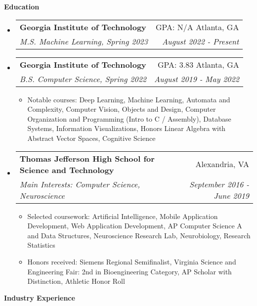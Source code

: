 \documentclass[letterpaper,11pt]{article}
\makeatletter
\newcommand{\resitem}[1]{\item #1 \vspace{-2pt}}
\newcommand{\resheading}[1]{{\large \colorbox{mygrey}{\begin{minipage}{\textwidth}{\textbf{#1 \vphantom{p\^{E}}}}\end{minipage}}}}
\newcommand{\ressubheading}[4]{
\begin{tabular*}{7.0in}{l@{\extracolsep{\fill}}r}
		\textbf{#1} & #2 \\
		\textit{#3} & \textit{#4} \\
\end{tabular*}\vspace{-6pt}}
\makeatother
\begin{document}
\resheading{Education}
\begin{itemize}
\item[]
    \ressubheading{Georgia Institute of Technology}{GPA: N/A \hspace{1em} Atlanta, GA}{M.S. Machine Learning, Spring 2023}{August 2022 - Present}
\item[]  %
    \ressubheading{Georgia Institute of Technology}{GPA: 3.83 \hspace{1em} Atlanta, GA}{B.S. Computer Science, Spring 2022}{August 2019 - May 2022}
	\begin{itemize}
	    \resitem{Notable courses: Deep Learning, Machine Learning, Automata and Complexity, Computer Vision, Objects and Design, Computer Organization and Programming (Intro to C / Assembly), Database Systems, Information Visualizations, Honors Linear Algebra with Abstract Vector Spaces, Cognitive Science}
	\end{itemize}
\item[]
    \ressubheading{Thomas Jefferson High School for Science and Technology}{Alexandria, VA}{Main Interests: Computer Science, Neuroscience}{September 2016 - June 2019}
	\begin{itemize}
        \resitem{Selected coursework: Artificial Intelligence, Mobile Application Development, Web Application Development, AP Computer Science A and Data Structures, Neuroscience Research Lab, Neurobiology, Research Statistics}
        \resitem{Honors received: Siemens Regional Semifinalist, Virginia Science and Engineering Fair: 2nd in Bioengineering Category, AP Scholar with Distinction, Athletic Honor Roll}
	\end{itemize}
\end{itemize}


\resheading{Industry Experience}
\end{document}
